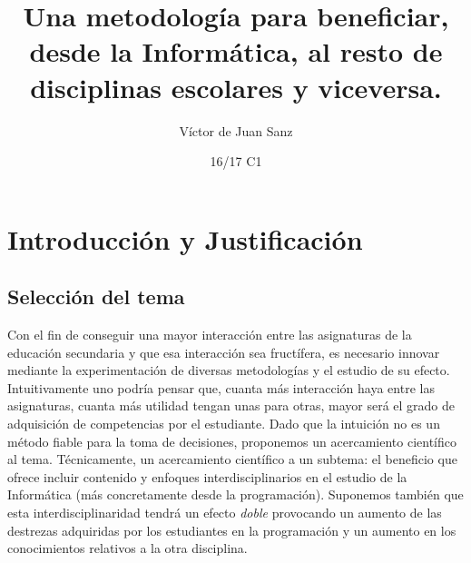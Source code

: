 \documentclass[palatino,miniheader]{apuntesURJC}
\title{Una metodología para beneficiar, desde la Informática, al resto de disciplinas escolares y viceversa.}
\author{Víctor de Juan Sanz}
\date{16/17 C1}
\begin{document}
\pagestyle{plain}
\maketitle

\tableofcontents
\newpage





\chapter{Introducción y Justificación}
\section{Selección del tema}

Con el fin de conseguir una mayor interacción entre las asignaturas de la educación secundaria y que esa interacción sea fructífera, es necesario innovar mediante la experimentación de diversas metodologías y el estudio de su efecto.
%
Intuitivamente uno podría pensar que, cuanta más interacción haya entre las asignaturas, cuanta más utilidad tengan unas para otras, mayor será el grado de adquisición de competencias por el estudiante.
%
Dado que la intuición no es un método fiable para la toma de decisiones, proponemos un acercamiento científico al tema. 
%
Técnicamente, un acercamiento científico a un subtema: el beneficio que ofrece incluir contenido y enfoques interdisciplinarios en el estudio de la Informática (más concretamente desde la programación).
%
Suponemos también que esta interdisciplinaridad tendrá un efecto \textit{doble} provocando un aumento de las destrezas adquiridas por los estudiantes en la programación y un aumento en los conocimientos relativos a la otra disciplina.
\end{document}
